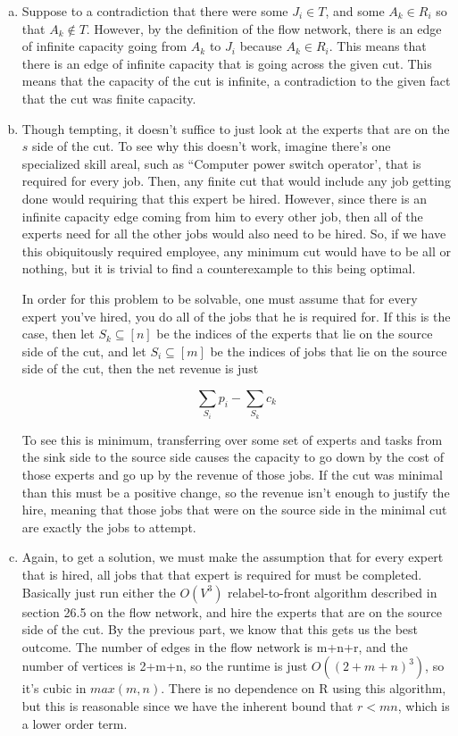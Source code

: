 \documentclass{article}
\begin{document}
\begin{enumerate}[a.]
\item
Suppose to a contradiction that there were some $J_i\in T$, and some $A_k\in R_i$ so that $A_k \not \in T$. However, by the definition of the flow network, there is an edge of infinite capacity going from $A_k$ to $J_i$ because $A_k \in R_i$. This means that there is an edge of infinite capacity that is going across the given cut. This means that the capacity of the cut is infinite, a contradiction to the given fact that the cut was finite capacity.
\item
Though tempting, it doesn't suffice to just look at the experts that are on the $s$ side of the cut. To see why this doesn't work, imagine there's one specialized skill areal, such as ``Computer power switch operator', that is required for every job. Then, any finite cut that would include any job getting done would requiring that this expert be hired. However, since there is an infinite capacity edge coming from him to every other job, then all of the experts need for all the other jobs would also need to be hired. So, if we have this obiquitously required employee, any minimum cut would have to be all or nothing, but it is trivial to find a counterexample to this being optimal. 

In order for this problem to be solvable, one must assume that for every expert you've hired, you do all of the jobs that he is required for. If this is the case, then let $S_k\subseteq [n]$ be the indices of the experts that lie on the source side of the cut, and let $S_i \subseteq[m]$ be the indices of jobs that lie on the source side of the cut, then the net revenue is just

\[
\sum_{S_i} p_i - \sum_{S_k} c_k
\]

To see this is minimum, transferring over some set of experts and tasks from the sink side to the source side causes the capacity to go down by the cost of those experts and go up by the revenue of those jobs. If the cut was minimal than this must be a positive change, so the revenue isn't enough to justify the hire, meaning that those jobs that were on the source side in the minimal cut are exactly the jobs to attempt.

\item

Again, to get a solution, we must make the assumption that for every expert that is hired, all jobs that that expert is required for must be completed. Basically just run either the $O(V^3)$ relabel-to-front algorithm described in section 26.5 on the flow network, and hire the experts that are on the source side of the cut. By the previous part, we know that this gets us the best outcome. The number of edges in the flow network is m+n+r, and the number of vertices is 2+m+n, so the runtime is just $O((2+m+n)^3)$, so it's cubic in $max(m,n)$. There is no dependence on R using this algorithm, but this is reasonable since we have the inherent bound that $r<mn$, which is a lower order term.


\end{enumerate}
\end{document}

